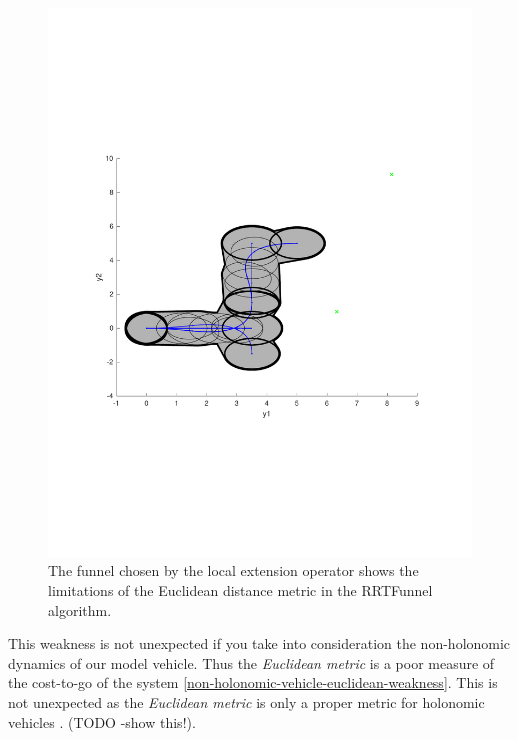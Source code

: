 \begin{figure}
\includegraphics[scale=.5]{figures/rrtfunnel/euclidean-distance-closest-funnel4}
\caption{The funnel chosen by the local extension operator shows the limitations
of the Euclidean distance metric in the RRTFunnel algorithm.}
\end{figure}

This weakness is not unexpected if you take into consideration the non-holonomic
dynamics of our model vehicle. Thus the \textit{Euclidean metric} is a poor
measure of the cost-to-go of the system
\ref{non-holonomic-vehicle-euclidean-weakness}. This is not unexpected as
the \textit{Euclidean metric} is only a proper metric for holonomic vehicles \cite{parkFeedbackMotionPlanning2015}.
(TODO -show this!).


